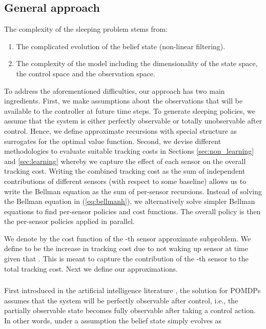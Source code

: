 \documentclass[journal,draftcls,onecolumn,11pt]{IEEEtran}
\newcommand{\QMDP}{}
\begin{document}
\subsection{General approach}
The complexity of the sleeping problem stems from:
\begin{enumerate}
\item The complicated evolution of the belief state  (non-linear filtering).
\item The complexity of the model including the dimensionality of the state space, the control space and the observation space.
\end{enumerate}
To address the aforementioned difficulties, our approach has two main ingredients. First, we make assumptions about the observations that will be available to the controller at future time steps. To generate sleeping policies, we assume that the system is either perfectly observable or totally unobservable after control. Hence, we define approximate recursions with special structure as surrogates for the optimal value function. Second, we devise different methodologies to evaluate suitable tracking costs in Sections \ref{sec:non_learning} and \ref{sec:learning} whereby we capture the effect of each sensor on the overall tracking cost. Writing the combined tracking cost as the sum of independent contributions of different sensors (with respect to some baseline) allows us to write the Bellman equation as the sum of per-sensor recursions. Instead of solving the Bellman equation in (\ref{eq:bellmanh}), we alternatively solve  simpler Bellman equations to find per-sensor policies and cost functions. The overall policy is then the per-sensor policies applied in parallel.

We denote by  the cost function of the -th sensor approximate subproblem. We define  to be the increase in tracking cost due to not waking up sensor  at time  given that . This is meant to capture the contribution of the -th sensor to the total tracking cost. Next we define our approximations.


\subsubsection{\QMDP{}}
First introduced in the artificial intelligence literature \cite{cassandra97,QMDP}, the \QMDP{} solution for POMDPs assumes that the system will be perfectly observable after control, i.e., the partially observable state becomes fully observable after taking a control action. In other words, under a \QMDP{} assumption the belief state simply evolves as
\end{document}
